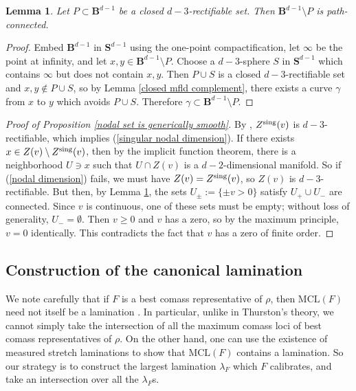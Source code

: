 \documentclass[reqno,11pt]{amsart}
\newcommand{\Sph}{\mathbf S}
\newcommand{\Ball}{\mathbf{B}}
\newcommand{\MCL}{\mathrm{MCL}}
\newtheorem{lemma}[theorem]{Lemma}
\theoremstyle{definition}
\numberwithin{equation}{section}
\begin{document}
\begin{lemma}\label{open mfld complement}
Let $P \subset \Ball^{d - 1}$ be a closed $d - 3$-rectifiable set.
Then $\Ball^{d - 1} \setminus P$ is path-connected.
\end{lemma}
\begin{proof}
Embed $\Ball^{d - 1}$ in $\Sph^{d - 1}$ using the one-point compactification, let $\infty$ be the point at infinity, and let $x, y \in \Ball^{d - 1} \setminus P$.
Choose a $d - 3$-sphere $S$ in $\Sph^{d - 1}$ which contains $\infty$ but does not contain $x, y$.
Then $P \cup S$ is a closed $d - 3$-rectifiable set and $x, y \notin P \cup S$, so by Lemma \ref{closed mfld complement}, there exists a curve $\gamma$ from $x$ to $y$ which avoids $P \cup S$.
Therefore $\gamma \subset \Ball^{d - 1} \setminus P$.
\end{proof}

\begin{proof}[Proof of Proposition \ref{nodal set is generically smooth}]
By \cite[Lemma 1.9]{Hardt89}, $Z^{\rm sing}(v)$ is $d - 3$-rectifiable, which implies (\ref{singular nodal dimension}).
If there exists $x \in Z(v) \setminus Z^{\rm sing}(v)$, then by the implicit function theorem, there is a neighborhood $U \ni x$ such that $U \cap Z(v)$ is a $d - 2$-dimensional manifold.
So if (\ref{nodal dimension}) fails, we must have $Z(v) = Z^{\rm sing}(v)$, so $Z(v)$ is $d - 3$-rectifiable.
But then, by Lemma \ref{open mfld complement}, the sets $U_\pm := \{\pm v > 0\}$ satisfy $U_+ \cup U_-$ are connected.
Since $v$ is continuous, one of these sets must be empty; without loss of generality, $U_- = \emptyset$.
Then $v \geq 0$ and $v$ has a zero, so by the maximum principle, $v = 0$ identically.
This contradicts the fact that $v$ has a zero of finite order.
\end{proof}


\subsection{Construction of the canonical lamination}
We note carefully that if $F$ is a best comass representative of $\rho$, then $\MCL(F)$ need not itself be a lamination \cite[Example 5.4]{bangert_cui_2017}.
In particular, unlike in Thurston's theory, we cannot simply take the intersection of all the maximum comass loci of best comass representatives of $\rho$.
On the other hand, one can use the existence of measured stretch laminations to show that $\MCL(F)$ contains a lamination.
So our strategy is to construct the largest lamination $\lambda_F$ which $F$ calibrates, and take an intersection over all the $\lambda_F$s.
\end{document}
